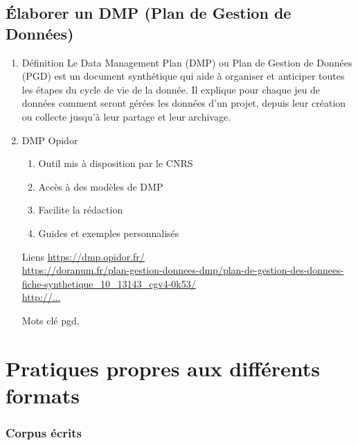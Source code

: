 \documentclass{book}
\begin{document}
\subsection{Élaborer un DMP (Plan de Gestion de Données)}

\begin{enumerate}
	\item Définition
     Le Data Management Plan (DMP) ou Plan de Gestion de Données (PGD) est un document synthétique qui aide à organiser et anticiper toutes les étapes du cycle de vie de la donnée. Il explique pour chaque jeu de données comment seront gérées les données d’un projet, depuis leur création ou collecte jusqu’à leur partage et leur archivage.
	\item DMP Opidor  
        \begin{enumerate}
            \item Outil mis à disposition par le CNRS
            \item Accès à des modèles de DMP
            \item Facilite la rédaction
            \item Guides et exemples personnalisés
        \end{enumerate}
\end{enumerate}

\begin{itemize}
    \item [Liens]
        \url{https://dmp.opidor.fr/}\\
        \url{https://doranum.fr/plan-gestion-donnees-dmp/plan-de-gestion-des-donnees-fiche-synthetique_10_13143_cgv4-0k53/}\\
        \url{http://...}\\
    \item [Mots clé]
        \gls{pgd},
\end{itemize}

\section{Pratiques propres aux différents formats}%

\subsubsection{Corpus écrits} 
\end{document}
